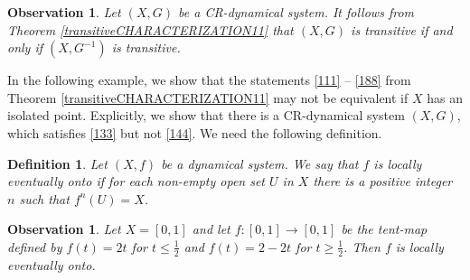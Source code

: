 \documentclass[a4paper,12pt]{article} %
\newtheorem{definition}[theorem]{Definition}
\newtheorem{observation}[theorem]{Observation}
\begin{document}
{
\begin{observation}\label{naminusena}
Let $(X,G)$ be a CR-dynamical system. It follows from Theorem \ref{transitiveCHARACTERIZATION11} that $(X,G)$ is transitive if and only if $(X,G^{-1})$ is transitive.
\end{observation}
}
In the following example, we show that the statements \ref{111} -- \ref{188} from Theorem  \ref{transitiveCHARACTERIZATION11} may not be equivalent if $X$ has an isolated point. Explicitly, we show that there is a CR-dynamical system $(X,G)$, which satisfies \ref{133} but not \ref{144}.  We need the following definition.
\begin{definition}
Let $(X,f)$ be a dynamical system. We say that $f$ is locally eventually onto if for each non-empty open set $U$ in $X$ there is a positive integer $n$ such that $f^n(U)=X$.
\end{definition}
\begin{observation}
Let $X=[0,1]$ and let $f:[0,1]\rightarrow [0,1]$ be the tent-map defined by $f(t)=2t$ for $t\leq \frac{1}{2}$ and $f(t)=2-2t$ for $t\geq \frac{1}{2}$. Then $f$ is locally eventually onto.
\end{observation}
\end{document}
